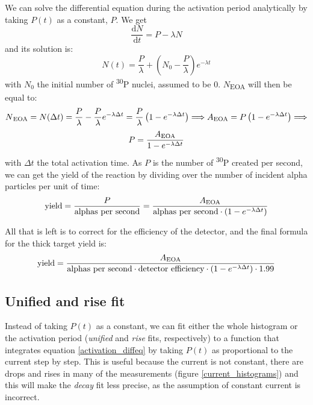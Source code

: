 \documentclass[a4paper,12pt]{report}
\newcommand{\dif}{\text{d}}
\newcommand{\ddt}[1]{\frac{\dif #1}{\dif t}}
\newcommand{\Piso}{\textsuperscript{30}P }
\begin{document}
We can solve the differential equation during the activation period analytically by taking $P(t)$ as a constant, $P$.
We get
\[ \ddt{N} = P -\lambda N  \]
and its solution is:
\begin{equation}
	N(t) = \frac{P}{\lambda} + \left(  N_0 - \frac{P}{\lambda}  \right) e^{-\lambda t}
\end{equation}
with $N_0$ the initial number of \Piso nuclei, assumed to be \num{0}.
$N$\textsubscript{EOA} will then be equal to:
\[ N\textsubscript{EOA} =N(\Delta t) = \frac{P}{\lambda} - \frac{P}{\lambda} e^{-\lambda \Delta t} = \frac{P}{\lambda} \left(1 - e^{-\lambda \Delta t} \right)\Longrightarrow A\textsubscript{EOA}=P\left(1-e^{-\lambda\Delta t}\right)\Longrightarrow \]
\begin{equation}
	P = \frac{A\textsubscript{EOA}}{1 - e^{-\lambda \Delta t}}
\end{equation}
with $\Delta t$ the total activation time.
As $P$ is the number of \Piso created per second, we can get the yield of the reaction by dividing over the number of incident alpha particles per unit of time:
\begin{equation}
	\text{yield} = \frac{P}{\text{alphas per second}} = \frac{A\textsubscript{EOA}}{\text{alphas per second} \cdot \left(1 - e^{-\lambda \Delta t} \right)}
\end{equation}

All that is left is to correct for the efficiency of the detector, and the final formula for the thick target yield is:
\begin{equation}
	\text{yield} = \frac{A\textsubscript{EOA}}{\text{alphas per second} \cdot \text{detector efficiency} \cdot \left(1 - e^{-\lambda \Delta t} \right) \cdot 1.99}	%
\end{equation}

\subsection{Unified and rise fit}
Instead of taking $P(t)$ as a constant, we can fit either the whole histogram or the activation period (\textit{unified} and \textit{rise} fits, respectively) to a function that integrates equation \ref{activation_diffeq} by taking $P(t)$ as proportional to the current step by step.
This is useful because the current is not constant, there are drops and rises in many of the measurements (figure \ref{current_histograms}) and this will make the \textit{decay} fit less precise, as the assumption of constant current is incorrect.
\end{document}
